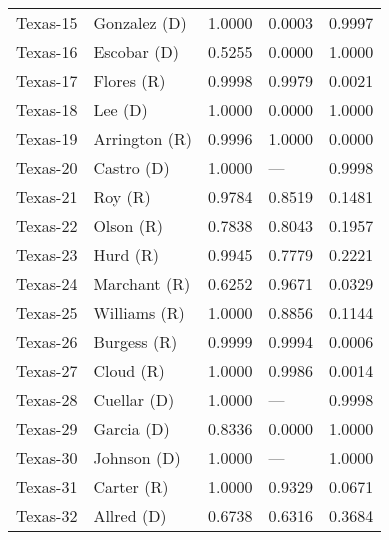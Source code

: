 \begin{longtable}{llrll}
          Texas-15 &        {\color{Blue} Gonzalez (D)} &       1.0000 &        0.0003 &        0.9997 \\
          Texas-16 &         {\color{Blue} Escobar (D)} &       0.5255 &        0.0000 &        1.0000 \\
          Texas-17 &           {\color{Red} Flores (R)} &       0.9998 &        0.9979 &        0.0021 \\
          Texas-18 &             {\color{Blue} Lee (D)} &       1.0000 &        0.0000 &        1.0000 \\
          Texas-19 &        {\color{Red} Arrington (R)} &       0.9996 &        1.0000 &        0.0000 \\
          Texas-20 &          {\color{Blue} Castro (D)} &       1.0000 &           --- &        0.9998 \\
          Texas-21 &              {\color{Red} Roy (R)} &       0.9784 &        0.8519 &        0.1481 \\
          Texas-22 &            {\color{Red} Olson (R)} &       0.7838 &        0.8043 &        0.1957 \\
          Texas-23 &             {\color{Red} Hurd (R)} &       0.9945 &        0.7779 &        0.2221 \\
          Texas-24 &         {\color{Red} Marchant (R)} &       0.6252 &        0.9671 &        0.0329 \\
          Texas-25 &         {\color{Red} Williams (R)} &       1.0000 &        0.8856 &        0.1144 \\
          Texas-26 &          {\color{Red} Burgess (R)} &       0.9999 &        0.9994 &        0.0006 \\
          Texas-27 &            {\color{Red} Cloud (R)} &       1.0000 &        0.9986 &        0.0014 \\
          Texas-28 &         {\color{Blue} Cuellar (D)} &       1.0000 &           --- &        0.9998 \\
          Texas-29 &          {\color{Blue} Garcia (D)} &       0.8336 &        0.0000 &        1.0000 \\
          Texas-30 &         {\color{Blue} Johnson (D)} &       1.0000 &           --- &        1.0000 \\
          Texas-31 &           {\color{Red} Carter (R)} &       1.0000 &        0.9329 &        0.0671 \\
          Texas-32 &          {\color{Blue} Allred (D)} &       0.6738 &        0.6316 &        0.3684 \\

\end{longtable}
